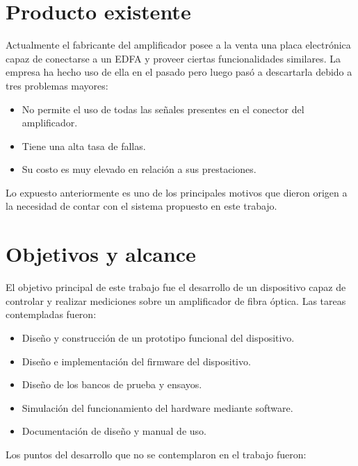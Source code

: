 
\section{Producto existente}

Actualmente el fabricante del amplificador posee a la venta una placa electrónica capaz de conectarse a un EDFA y proveer ciertas funcionalidades similares. La empresa ha hecho uso de ella en el pasado pero luego pasó a descartarla debido a tres problemas mayores:

\begin{itemize}
\item No permite el uso de todas las señales presentes en el conector del amplificador.
\item Tiene una alta tasa de fallas.
\item Su costo es muy elevado en relación a sus prestaciones.
\end{itemize}

Lo expuesto anteriormente es uno de los principales motivos que dieron origen a la necesidad de contar con el sistema propuesto en este trabajo.


\section{Objetivos y alcance}

El objetivo principal de este trabajo fue el desarrollo de un dispositivo capaz de controlar y realizar mediciones sobre un amplificador de fibra óptica. Las tareas contempladas fueron:

\begin{itemize}
\item Diseño y construcción de un prototipo funcional del dispositivo.
\item Diseño e implementación del firmware del dispositivo.
\item Diseño de los bancos de prueba y ensayos.
\item Simulación del funcionamiento del hardware mediante software.
\item Documentación de diseño y manual de uso.
\end{itemize}

Los puntos del desarrollo que no se contemplaron en el trabajo fueron:

